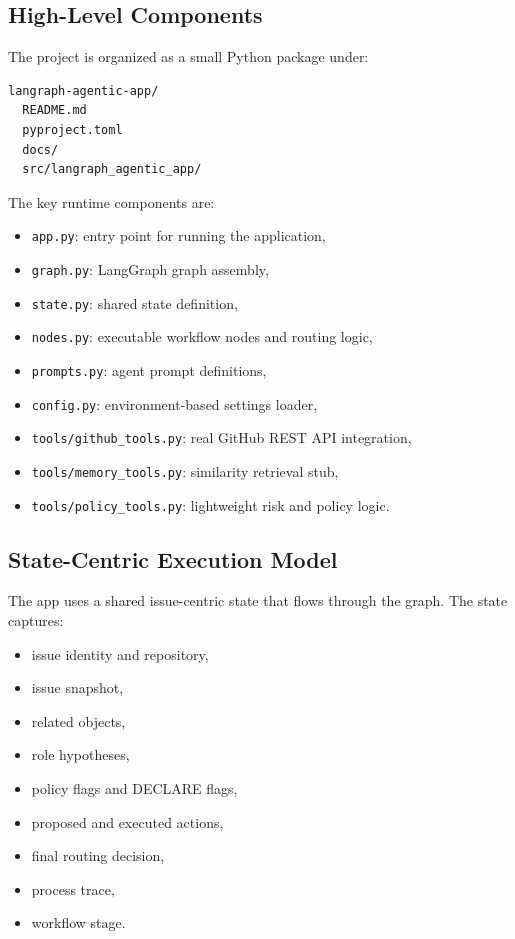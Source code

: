\documentclass[11pt,a4paper]{article}
\begin{document}
\subsection{High-Level Components}

The project is organized as a small Python package under:

\begin{lstlisting}[style=bashstyle]
langraph-agentic-app/
  README.md
  pyproject.toml
  docs/
  src/langraph_agentic_app/
\end{lstlisting}

The key runtime components are:
\begin{itemize}
    \item \texttt{app.py}: entry point for running the application,
    \item \texttt{graph.py}: LangGraph graph assembly,
    \item \texttt{state.py}: shared state definition,
    \item \texttt{nodes.py}: executable workflow nodes and routing logic,
    \item \texttt{prompts.py}: agent prompt definitions,
    \item \texttt{config.py}: environment-based settings loader,
    \item \texttt{tools/github\_tools.py}: real GitHub REST API integration,
    \item \texttt{tools/memory\_tools.py}: similarity retrieval stub,
    \item \texttt{tools/policy\_tools.py}: lightweight risk and policy logic.
\end{itemize}

\subsection{State-Centric Execution Model}

The app uses a shared issue-centric state that flows through the graph. The state captures:
\begin{itemize}
    \item issue identity and repository,
    \item issue snapshot,
    \item related objects,
    \item role hypotheses,
    \item policy flags and DECLARE flags,
    \item proposed and executed actions,
    \item final routing decision,
    \item process trace,
    \item workflow stage.
\end{itemize}
\end{document}
